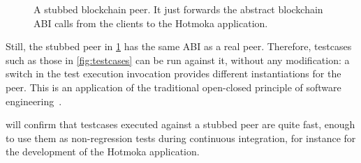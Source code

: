 \begin{figure}[t]
  \begin{center}
  \end{center}
  \caption{A stubbed blockchain peer.
    It just forwards the abstract blockchain ABI calls
    from the clients to the Hotmoka application.}
  \label{fig:stubbed}
\end{figure}

Still, the stubbed peer in \cref{fig:stubbed} has the same ABI
as a real peer. Therefore, testcases such as those in \cref{fig:testcases} can be run
against it, without any modification: a switch in the test execution invocation
provides different instantiations for the peer. This is an application of the
traditional open-closed principle of software engineering~\citep{Meyer97}.

 will confirm that testcases executed against a stubbed peer
are quite fast, enough to use them as non-regression tests during continuous
integration, for instance for the development of the Hotmoka application.
